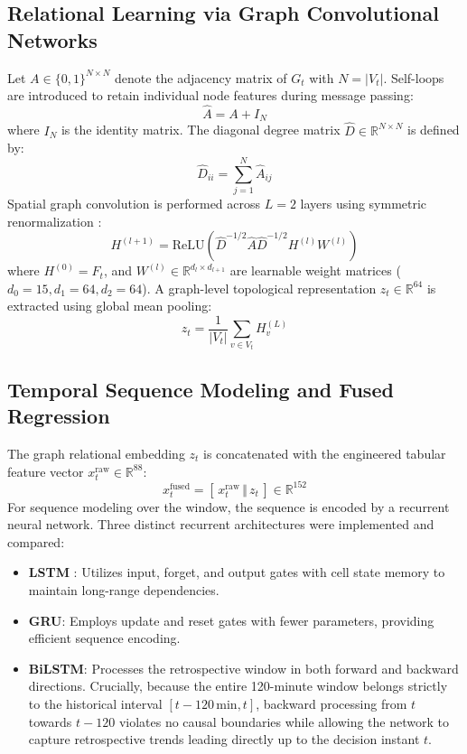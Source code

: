 \documentclass[10pt,a4paper]{article}
\begin{document}
\subsection{Relational Learning via Graph Convolutional Networks}
Let $A \in \{0, 1\}^{N \times N}$ denote the adjacency matrix of $G_t$ with $N = |V_t|$. Self-loops are introduced to retain individual node features during message passing:
\begin{equation}
\hat{A} = A + I_N
\end{equation}
where $I_N$ is the identity matrix. The diagonal degree matrix $\hat{D} \in \mathbb{R}^{N \times N}$ is defined by:
\begin{equation}
\hat{D}_{ii} = \sum_{j=1}^N \hat{A}_{ij}
\end{equation}
Spatial graph convolution is performed across $L = 2$ layers using symmetric renormalization \cite{kipf2017}:
\begin{equation}
H^{(l+1)} = \mathrm{ReLU}\left(\hat{D}^{-1/2} \hat{A} \hat{D}^{-1/2} H^{(l)} W^{(l)}\right)
\end{equation}
where $H^{(0)} = F_t$, and $W^{(l)} \in \mathbb{R}^{d_l \times d_{l+1}}$ are learnable weight matrices ($d_0 = 15, d_1 = 64, d_2 = 64$). A graph-level topological representation $z_t \in \mathbb{R}^{64}$ is extracted using global mean pooling:
\begin{equation}
z_t = \frac{1}{|V_t|} \sum_{v \in V_t} H^{(L)}_v
\end{equation}

\subsection{Temporal Sequence Modeling and Fused Regression}
The graph relational embedding $z_t$ is concatenated with the engineered tabular feature vector $x_t^{\mathrm{raw}} \in \mathbb{R}^{88}$:
\begin{equation}
x_t^{\mathrm{fused}} = \left[\, x_t^{\mathrm{raw}} \,\Vert\, z_t \,\right] \in \mathbb{R}^{152}
\end{equation}
For sequence modeling over the window, the sequence is encoded by a recurrent neural network. Three distinct recurrent architectures were implemented and compared:
\begin{itemize}
    \item \textbf{LSTM} \cite{hochreiter1997}: Utilizes input, forget, and output gates with cell state memory to maintain long-range dependencies.
    \item \textbf{GRU}: Employs update and reset gates with fewer parameters, providing efficient sequence encoding.
    \item \textbf{BiLSTM}: Processes the retrospective window in both forward and backward directions. Crucially, because the entire 120-minute window belongs strictly to the historical interval $[t - 120\,\mathrm{min}, t]$, backward processing from $t$ towards $t - 120$ violates no causal boundaries while allowing the network to capture retrospective trends leading directly up to the decision instant $t$.
\end{itemize}
\end{document}
